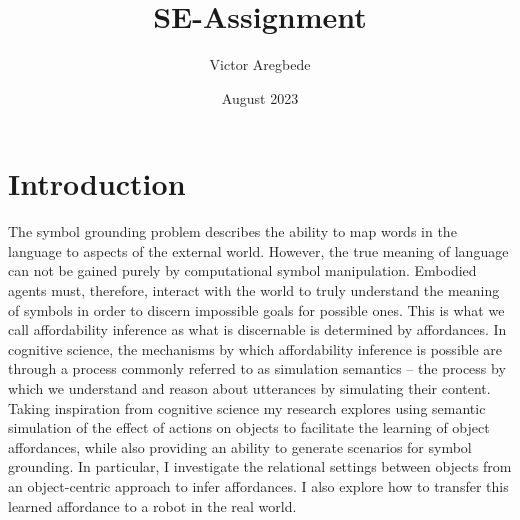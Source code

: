 \documentclass[11pt]{article}
\title{SE-Assignment}
\author{Victor Aregbede}
\date{August 2023}
\begin{document}
\maketitle

\section{Introduction}
The symbol grounding problem describes the ability to map words in the language to aspects of the external world. However, the true meaning of language can not be gained purely by computational symbol manipulation. Embodied agents must, therefore, interact with the world to truly understand the meaning of symbols in order to discern impossible goals for possible ones. This is what we call affordability inference as what is discernable is determined by affordances. In cognitive science, the mechanisms by which affordability inference is possible are through a process commonly referred to as simulation semantics – the process by which we understand and reason about utterances by simulating their content. Taking inspiration from cognitive science my research explores using semantic simulation of the effect of actions on objects to facilitate the learning of object affordances, while also providing an ability to generate scenarios for symbol grounding. In particular, I investigate the relational settings between objects from an object-centric approach to infer affordances. I also explore how to transfer this learned affordance to a robot in the real world.
\end{document}
